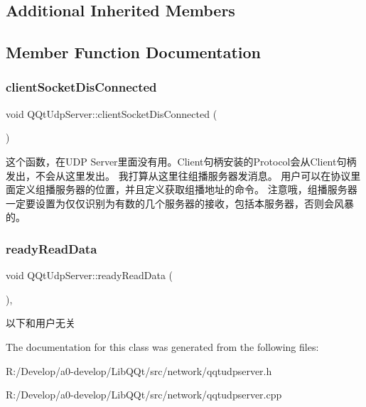 \subsection*{Additional Inherited Members}


\subsection{Member Function Documentation}
\mbox{\label{class_q_qt_udp_server_a211ac52377f5a841ea470f129b31c287}} 
\subsubsection{\texorpdfstring{client\+Socket\+Dis\+Connected}{clientSocketDisConnected}}
{\footnotesize\ttfamily void Q\+Qt\+Udp\+Server\+::client\+Socket\+Dis\+Connected (\begin{DoxyParamCaption}{ }\end{DoxyParamCaption})\hspace{0.3cm}{\ttfamily [slot]}}

这个函数，在\+U\+DP Server里面没有用。\+Client句柄安装的\+Protocol会从\+Client句柄发出，不会从这里发出。 我打算从这里往组播服务器发消息。 用户可以在协议里面定义组播服务器的位置，并且定义获取组播地址的命令。 注意哦，组播服务器一定要设置为仅仅识别为有数的几个服务器的接收，包括本服务器，否则会风暴的。 \mbox{\label{class_q_qt_udp_server_a1852aa81a63fd5c06e583bde55eaed2e}} 
\subsubsection{\texorpdfstring{ready\+Read\+Data}{readyReadData}}
{\footnotesize\ttfamily void Q\+Qt\+Udp\+Server\+::ready\+Read\+Data (\begin{DoxyParamCaption}{ }\end{DoxyParamCaption})\hspace{0.3cm}{\ttfamily [protected]}, {\ttfamily [slot]}}

以下和用户无关 

The documentation for this class was generated from the following files\+:\begin{DoxyCompactItemize}
\item 
R\+:/\+Develop/a0-\/develop/\+Lib\+Q\+Qt/src/network/qqtudpserver.\+h\item 
R\+:/\+Develop/a0-\/develop/\+Lib\+Q\+Qt/src/network/qqtudpserver.\+cpp\end{DoxyCompactItemize}
